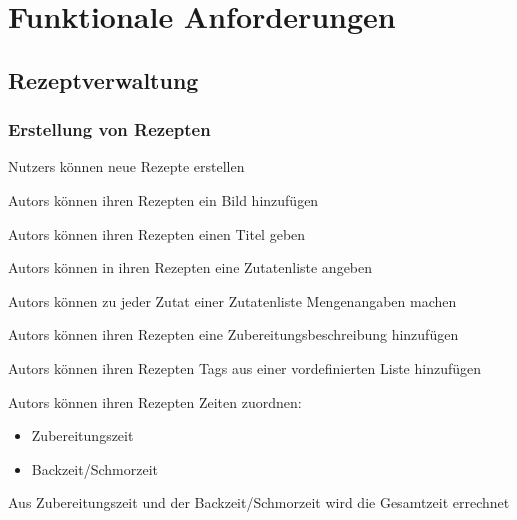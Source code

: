 \chapter{Funktionale Anforderungen}


	 
\section{Rezeptverwaltung}

	\subsection{Erstellung von Rezepten}
	
		\Glspl{Nutzer} können neue Rezepte erstellen
	
			\Glspl{Autor} können ihren Rezepten ein Bild hinzufügen

			\Glspl{Autor} können ihren Rezepten einen Titel geben

			\Glspl{Autor} können in ihren Rezepten eine Zutatenliste angeben

			\Glspl{Autor} können zu jeder Zutat einer Zutatenliste Mengenangaben machen

			\Glspl{Autor} können ihren Rezepten eine Zubereitungsbeschreibung hinzufügen

			\Glspl{Autor} können ihren Rezepten \glspl{Tag} aus einer vordefinierten Liste hinzufügen

			\Glspl{Autor} können ihren Rezepten Zeiten zuordnen:
					\begin{itemize}[nosep]
						\item \gls{Zubereitungszeit}
						\item \gls{Backzeit/Schmorzeit}
					\end{itemize}
		
			Aus \gls{Zubereitungszeit} und der \gls{Backzeit/Schmorzeit} wird die Gesamtzeit errechnet
					
